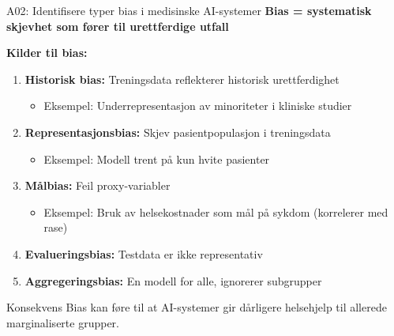 \documentclass[aspectratio=169, 10pt]{beamer}
\begin{document}
\begin{frame}{A02: Identifisere typer bias i medisinske AI-systemer}
    \textbf{Bias = systematisk skjevhet som fører til urettferdige utfall}
    
    \vspace{0.3cm}
    \textbf{Kilder til bias:}
    \begin{enumerate}
        \item \textbf{Historisk bias:} Treningsdata reflekterer historisk urettferdighet
        \begin{itemize}
            \item Eksempel: Underrepresentasjon av minoriteter i kliniske studier
        \end{itemize}
        
        \item \textbf{Representasjonsbias:} Skjev pasientpopulasjon i treningsdata
        \begin{itemize}
            \item Eksempel: Modell trent på kun hvite pasienter
        \end{itemize}
        
        \item \textbf{Målbias:} Feil proxy-variabler
        \begin{itemize}
            \item Eksempel: Bruk av helsekostnader som mål på sykdom (korrelerer med rase)
        \end{itemize}
        
        \item \textbf{Evalueringsbias:} Testdata er ikke representativ
        
        \item \textbf{Aggregeringsbias:} En modell for alle, ignorerer subgrupper
    \end{enumerate}
    
    \begin{alertblock}{Konsekvens}
        Bias kan føre til at AI-systemer gir dårligere helsehjelp til allerede marginaliserte grupper.
    \end{alertblock}
\end{frame}
\end{document}
